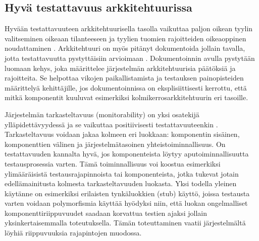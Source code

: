 \documentclass[finnish]{tktltiki2}
\theoremstyle{definition}
\theoremstyle{remark}
\begin{document}

\subsection{Hyvä testattavuus arkkitehtuurissa}



Hyvään testattavuuteen arkkitehtuurisella tasolla vaikuttaa paljon oikean tyylin valitseminen oikeaan tilanteeseen ja tyylien tuomien rajoitteiden oikeaoppinen noudattaminen \citep[s. 66]{Eickelmann:1996:MOS:243327.243602}. Arkkitehtuuri on myös pitänyt dokumentoida jollain tavalla, jotta testattavuutta pystyttäisiin arvioimaan \citep[s. 6]{mari_impact_2003}. Dokumentoinnin avulla pystytään luomaan kehys, joka määrittelee järjestelmän arkkitehtuurisia päätöksiä ja rajoitteita. Se helpottaa vikojen paikallistamista ja testauksen painopisteiden määrittelyä kehittäjille, jos dokumentoinnissa on eksplisiittisesti kerrottu, että mitkä komponentit kuuluvat esimerkiksi kolmikerrosarkkitehtuurin eri tasoille. 


Järjestelmän tarkasteltavuus (monitorability) on yksi osatekijä ylläpidettävyydessä ja se vaikuttaa positiivisesti testattavuuteenkin \citep[s. 4]{mari_impact_2003}. Tarkasteltavuus voidaan jakaa kolmeen eri luokkaan: komponentin sisäinen, komponenttien välinen ja järjestelmätasoinen yhteistoiminnallisuus. On testattavuuden kannalta hyvä, jos komponenteista löytyy aputoiminnallisuutta testausprosessia varten. Tämä toiminnallisuus voi koostua esimerkiksi ylimääräisistä testausrajapinnoista tai komponenteista, jotka tukevat jotain edellämainitusta kolmesta tarkasteltavuuden luokasta. Yksi todella yleinen käytänne on esimerkiksi erilaisten tynkäluokkien (stub) käyttö, joissa testausta varten voidaan polymorfismia käyttää hyödyksi niin, että luokan ongelmalliset komponenttiriippuvuudet saadaan korvattua testien ajaksi jollain yksinkertaisemmalla toteutuksella. Tämän toteuttaminen vaatii järjestelmältä löyhiä riippuvuuksia rajapintojen muodossa.
\end{document}
